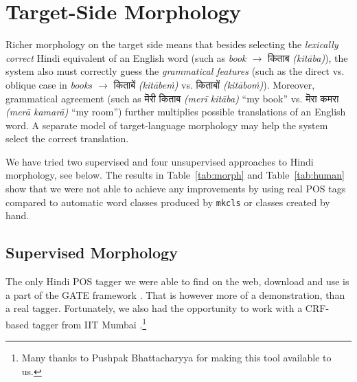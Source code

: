 \documentclass[11pt]{article}
\newcommand{\hindi}[1]{{\hi #1}}
\def\Sref#1{Section~\ref{#1}}
\def\Tref#1{Table~\ref{#1}}
\begin{document}
\section{Target-Side Morphology}
\label{morf}
Richer morphology on the target side means that besides selecting the
\textit{lexically correct} Hindi equivalent of an English word (such as
\textit{book $\rightarrow$} \hindi{किताब} \textit{(kitāba)}), the system also
must correctly guess the \textit{grammatical features} (such as the direct vs.
oblique case in \textit{books $\rightarrow$} \hindi{किताबें} \textit{(kitābeṁ)} vs.
\hindi{किताबों} \textit{(kitāboṁ)}).
Moreover, grammatical agreement (such as
\hindi{मॆरी किताब} \textit{(merī kitāba)} ``my book'' vs. \hindi{मॆरा कमरा}
\textit{(merā kamarā)} ``my room'') further multiplies possible translations
of an English word.
A separate model of target-language morphology may help the system select the
correct translation.

We have tried two supervised and four unsupervised approaches to Hindi
morphology, see below.
%
%
The results in \Tref{tab:morph} and \Tref{tab:human} show that we were not able
to achieve any improvements by using real POS tags
compared to automatic word classes produced by \texttt{mkcls} or classes created
by hand.

\subsection{Supervised Morphology} 
\label{sec:pos}

\label{sec:tagger}
The only Hindi POS tagger we were able to find on the web, download and use is a part of the
GATE framework \citep{Cunningham:2002rw}. That is however more of a
demonstration, than a real tagger.
Fortunately, we also had the opportunity to work with a CRF-based tagger from IIT
Mumbai \citep{Kuhoo-Gupta:2006gd}.\footnote{Many thanks to Pushpak
Bhattacharyya for making this tool available to us.}
\end{document}
